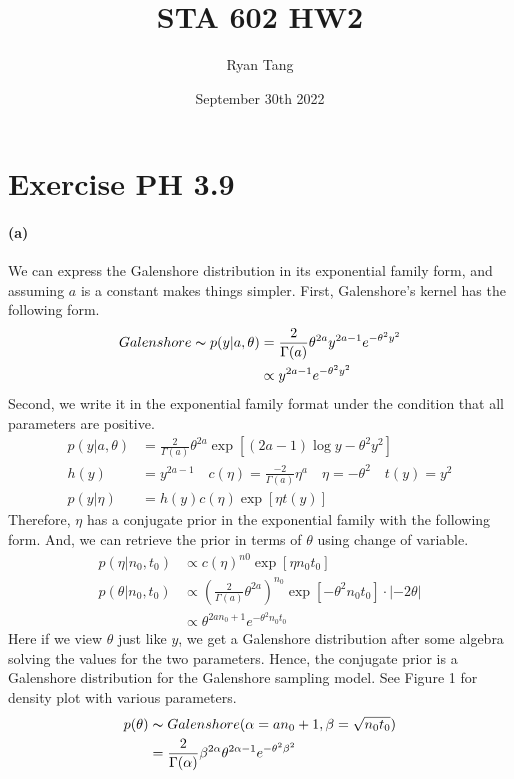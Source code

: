 \documentclass[11pt, letterpaper]{article}
\title{STA 602 HW2}
\author{Ryan Tang}
\date{September 30th 2022}
\begin{document}
\maketitle

\section{Exercise PH 3.9}
\paragraph{(a)}
We can express the Galenshore distribution in its exponential family form, and assuming $a$ is a constant makes things simpler.
First, Galenshore's kernel has the following form.
\begin{align*}
    Galenshore \thicksim p(y|a, \theta)
        &= \frac{2}{\Gamma(a)} \theta^{2a} y^{2a-1} e^{-\theta^2 y^2} \\
        &\propto y^{2a-1} e^{-\theta^2 y^2}
\end{align*}
Second, we write it in the exponential family format under the condition that all parameters are positive.
\begin{align*}
    p(y|a, \theta)
        &= \frac{2}{\Gamma(a)}\theta^{2a} \exp [(2a-1) \log y - \theta^2 y^2] \\
    h(y) &= y^{2a-1} \quad c(\eta) = \frac{-2}{\Gamma(a)}\eta^a \quad
    \eta = -\theta^2 \quad t(y) = y^2 \\
    p(y|\eta) &= h(y) c(\eta) \exp[\eta t(y)]
\end{align*}
Therefore, $\eta$ has a conjugate prior in the exponential family with the following form. And, we can retrieve the prior in terms of $\theta$ using change of variable. 
\begin{align*}
    p(\eta|n_0, t_0) &\propto c(\eta)^{n0} \exp[\eta n_0 t_0] \\
    p(\theta|n_0, t_0)
        &\propto (\frac{2}{\Gamma(a)}\theta^{2a})^{n_0} \exp[-\theta^2 n_0 t_0] \cdot |-2\theta| \\
        &\propto \theta^{2a n_0 + 1} e^{-\theta^2 n_0 t_0}
\end{align*}
Here if we view $\theta$ just like $y$, we get a Galenshore distribution after some algebra solving the values for the two parameters. Hence, the conjugate prior is a Galenshore distribution for the Galenshore sampling model. See Figure 1 for density plot with various parameters.
\begin{align*}
    p(\theta) &\thicksim Galenshore(\alpha=an_0 +1, \beta=\sqrt{n_0 t_0}) \\
        &= \frac{2}{\Gamma(\alpha)} \beta^{2\alpha}\theta^{2\alpha-1}e^{-\theta^2 \beta^2}
\end{align*}
\end{document}
